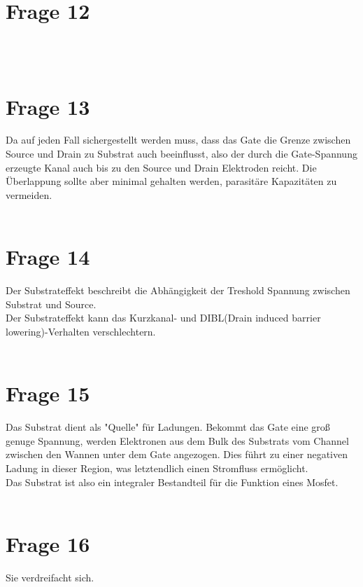 \documentclass[a4paper]{scrartcl}
\begin{document}
\section*{Frage 12}

~\\
~\\
\section*{Frage 13}
Da auf jeden Fall sichergestellt werden muss, dass das Gate die Grenze zwischen Source und Drain zu Substrat auch beeinflusst, also der durch die Gate-Spannung erzeugte Kanal auch bis zu den Source und Drain Elektroden reicht. Die Überlappung sollte aber minimal gehalten werden, parasitäre Kapazitäten zu vermeiden.
~\\
~\\
\section*{Frage 14}
Der Substrateffekt beschreibt die Abhängigkeit der Treshold Spannung zwischen Substrat und Source.\\
Der Substrateffekt kann das Kurzkanal- und DIBL(Drain induced barrier lowering)-Verhalten verschlechtern.
~\\
~\\
\section*{Frage 15}
Das Substrat dient als "Quelle" für Ladungen. Bekommt das Gate eine groß genuge Spannung, werden Elektronen aus dem Bulk des Substrats vom Channel zwischen den Wannen unter dem Gate angezogen. Dies führt zu einer negativen Ladung in dieser Region, was letztendlich einen Stromfluss ermöglicht. \\
Das Substrat ist also ein integraler Bestandteil für die Funktion eines Mosfet.
~\\
~\\
\section*{Frage 16}
Sie verdreifacht sich.
~\\
~\\
\end{document}
